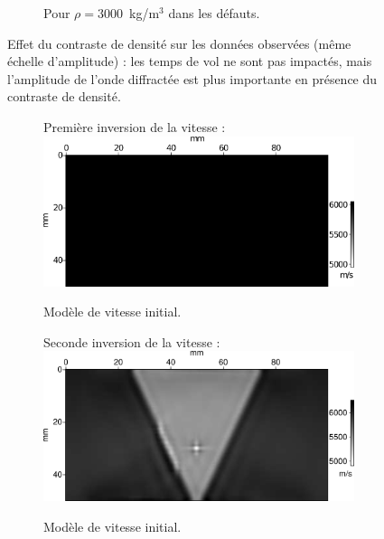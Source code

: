 \begin{figure}
\begin{subfigure}[b]{0.45\textwidth}
		\caption{Pour $\rho=3000$~kg/m$^{3}$ dans les défauts.}
	\end{subfigure}
	\caption{Effet du contraste de densité sur les données observées (même échelle d'amplitude) : les temps de vol ne sont pas impactés, mais l'amplitude de l'onde diffractée est plus importante en présence du contraste de densité. \label{app:traces_rho}}	
\end{figure}



	\begin{figure}[p]
	\begin{changemargin}{-2cm}{-2cm}
		\centering
		\begin{subfigure}[b]{0.29\textwidth}
			\centering
			Première inversion de la vitesse : \\[0.2cm]
			\includegraphics[width=\textwidth]{img/mono_param/vp_uni.png}
			\caption{Modèle de vitesse initial.}
		\end{subfigure}
		\begin{subfigure}[b]{0.29\textwidth}
			\centering
			Seconde inversion de la vitesse : \\[0.2cm] 
			\includegraphics[width=\textwidth]{img/mono_param/vp_smooth.png}
			\caption{Modèle de vitesse initial.}
		\end{subfigure}
		\begin{subfigure}[b]{0.29\textwidth}

\end{subfigure}
\end{changemargin}
\end{figure}
